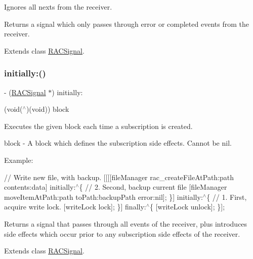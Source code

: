 Ignores all {\ttfamily next}s from the receiver.

Returns a signal which only passes through {\ttfamily error} or {\ttfamily completed} events from the receiver. 

Extends class \mbox{\hyperlink{interface_r_a_c_signal_a2997862d443d16efa3197facb6a354d1}{R\+A\+C\+Signal}}.

\mbox{\label{category_r_a_c_signal_07_operations_08_a2c8566a5d3b5997357d34ee5991a2e0c}} 
\subsubsection{\texorpdfstring{initially\+:()}{initially:()}\hspace{0.1cm}{\footnotesize\ttfamily [1/3]}}
{\footnotesize\ttfamily -\/ (\mbox{\hyperlink{interface_r_a_c_signal}{R\+A\+C\+Signal}} $\ast$) initially\+: \begin{DoxyParamCaption}\item[{(void($^\wedge$)(void))}]{block }\end{DoxyParamCaption}}

Executes the given block each time a subscription is created.

block -\/ A block which defines the subscription side effects. Cannot be {\ttfamily nil}.

Example\+:

// Write new file, with backup. \mbox{[}\mbox{[}\mbox{[}\mbox{[}file\+Manager rac\+\_\+create\+File\+At\+Path\+:path contents\+:data\mbox{]} initially\+:$^\wedge$\{ // 2. Second, backup current file \mbox{[}file\+Manager move\+Item\+At\+Path\+:path to\+Path\+:backup\+Path error\+:nil\mbox{]}; \}\mbox{]} initially\+:$^\wedge$\{ // 1. First, acquire write lock. \mbox{[}write\+Lock lock\mbox{]}; \}\mbox{]} finally\+:$^\wedge$\{ \mbox{[}write\+Lock unlock\mbox{]}; \}\mbox{]};

Returns a signal that passes through all events of the receiver, plus introduces side effects which occur prior to any subscription side effects of the receiver. 

Extends class \mbox{\hyperlink{interface_r_a_c_signal_a2c8566a5d3b5997357d34ee5991a2e0c}{R\+A\+C\+Signal}}.

\mbox{\label{category_r_a_c_signal_07_operations_08_a2c8566a5d3b5997357d34ee5991a2e0c}} 
